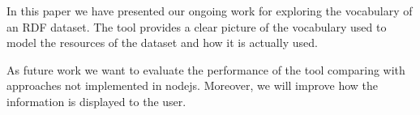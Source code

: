 In this paper we have presented our ongoing work for exploring the vocabulary of an RDF dataset. The tool provides a clear picture of the vocabulary used to model the resources of the dataset and how it is actually used.

As future work we want to evaluate the performance of the tool comparing with approaches not implemented in nodejs. Moreover, we will improve how the information is displayed to the user.
